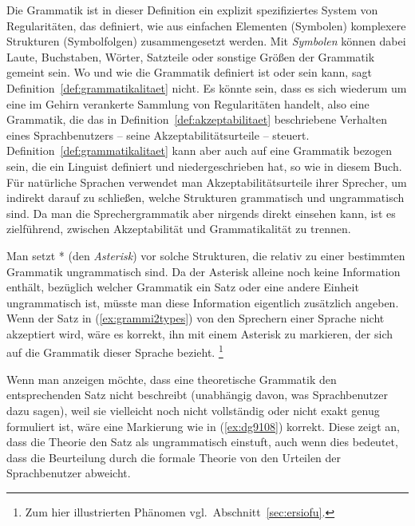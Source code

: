 
Die Grammatik ist in dieser Definition ein explizit spezifiziertes System von Regularitäten, das definiert, wie aus einfachen Elementen (Symbolen) komplexere Strukturen (Symbolfolgen) zusammengesetzt werden.
Mit \textit{Symbolen} können dabei Laute, Buchstaben, Wörter, Satzteile oder sonstige Größen der Grammatik gemeint sein.
Wo und wie die Grammatik definiert ist oder sein kann, sagt Definition~\ref{def:grammatikalitaet} nicht.
Es könnte sein, dass es sich wiederum um eine im Gehirn verankerte Sammlung von Regularitäten handelt, also eine Grammatik, die das in Definition~\ref{def:akzeptabilitaet} beschriebene Verhalten eines Sprachbenutzers -- seine Akzeptabilitätsurteile -- steuert.
Definition~\ref{def:grammatikalitaet} kann aber auch auf eine Grammatik bezogen sein, die ein Linguist definiert und niedergeschrieben hat, so wie in diesem Buch.
Für natürliche Sprachen verwendet man Akzeptabilitätsurteile ihrer Sprecher, um indirekt darauf zu schließen, welche Strukturen grammatisch und ungrammatisch sind.
Da man die Sprechergrammatik aber nirgends direkt einsehen kann, ist es zielführend, zwischen Akzeptabilität und Grammatikalität zu trennen.

Man setzt * (den \textit{Asterisk}) vor solche Strukturen, die relativ zu einer bestimmten Grammatik ungrammatisch sind.
Da der Asterisk alleine noch keine Information enthält, bezüglich welcher Grammatik ein Satz oder eine andere Einheit ungrammatisch ist, müsste man diese Information eigentlich zusätzlich angeben.
Wenn der Satz in (\ref{ex:grammi2types}) von den Sprechern einer Sprache nicht akzeptiert wird, wäre es korrekt, ihn mit einem Asterisk zu markieren, der sich auf die Grammatik dieser Sprache bezieht.%
\footnote{Zum hier illustrierten Phänomen vgl.\ Abschnitt~\ref{sec:ersiofu}.}

\begin{exe}
  \ex\label{ex:grammi2types}
  \begin{xlist}
  \end{xlist}
\end{exe}

Wenn man anzeigen möchte, dass eine theoretische Grammatik den entsprechenden Satz nicht beschreibt (unabhängig davon, was Sprachbenutzer dazu sagen), weil sie vielleicht noch nicht vollständig oder nicht exakt genug formuliert ist, wäre eine Markierung wie in (\ref{ex:dg9108}) korrekt.
Diese zeigt an, dass die Theorie den Satz als ungrammatisch einstuft, auch wenn dies bedeutet, dass die Beurteilung durch die formale Theorie von den Urteilen der Sprachbenutzer abweicht.

